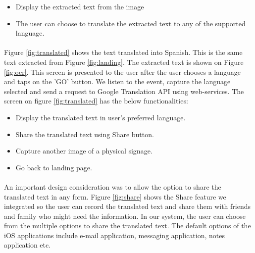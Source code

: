 \documentclass[12pt]{article}
\begin{document}
\begin{itemize}
	\item Display the extracted text from the image
	\item The user can choose to translate the extracted text to any of the supported language. 
\end{itemize}



\paragraph{}Figure \ref{fig:translated} shows the text translated into Spanish. This is the same text extracted from Figure \ref{fig:landing}. The extracted text is shown on Figure \ref{fig:ocr}. This screen is presented to the user after the user chooses a language and taps on the 'GO' button. We listen to the event, capture the language selected and send a request to Google Translation API using web-services. The screen on figure \ref{fig:translated} has the below functionalities:

\begin{itemize}
	\item Display the translated text in user's preferred language.
	\item Share the translated text using Share button.
	\item Capture another image of a physical signage.
	\item Go back to landing page.
\end{itemize}

\paragraph{}An important design consideration was to allow the option to share the translated text in any form. Figure \ref{fig:share} shows the Share feature we integrated so the user can record the translated text and share them with friends and family who might need the information. In our system, the user can choose from the multiple options to share the translated text. The default options of the iOS applications include e-mail application, messaging application, notes application etc. 
\end{document}
